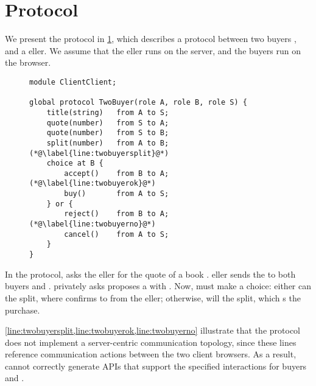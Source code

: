 \section{ Protocol}
\label{section:twobuyer}

We present the  protocol in \cref{lst:twobuyer},
which describes a protocol between two buyers , 
and a eller. We assume that the eller runs on
the server, and the buyers run on the browser.

\begin{figure}[!ht]
\begin{lstlisting}[language=scribble]
module ClientClient;

global protocol TwoBuyer(role A, role B, role S) {
	title(string)   from A to S;
	quote(number)   from S to A;
	quote(number)   from S to B;
	split(number)   from A to B; (*@\label{line:twobuyersplit}@*)
	choice at B {
		accept()    from B to A; (*@\label{line:twobuyerok}@*)
		buy()       from A to S;
	} or {
		reject()    from B to A; (*@\label{line:twobuyerno}@*)
		cancel()    from A to S;
	}
}
\end{lstlisting}
\label{lst:twobuyer}
\end{figure}

In the protocol,  asks the eller for the quote
of a book . eller sends the 
to both buyers  and .  privately asks
proposes a  with . Now,  must make
a choice: 
either  can  the split, where  confirms
to  from the eller;
otherwise,  will  the split, which
s the purchase.

\cref{line:twobuyersplit,line:twobuyerok,line:twobuyerno}
illustrate that the  protocol 
does not implement a server-centric communication topology,
since these lines reference communication actions between
the two client browsers. 
As a result,  cannot correctly generate
APIs that support the specified interactions 
for buyers  and .

